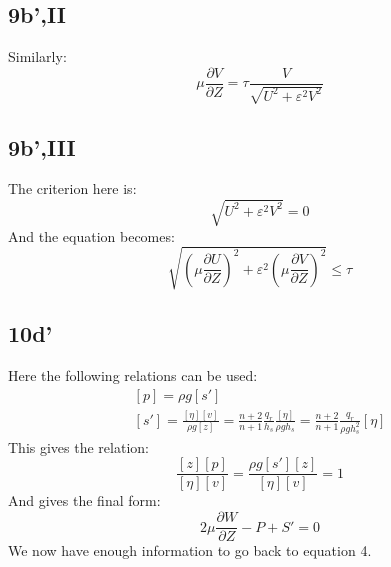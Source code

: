 \documentclass[10pt, letterpaper, twoside]{article}
\newcommand{\pd}[2]{\frac{\partial#1}{\partial#2}}
\begin{document}
	\subsection{9b',II}
	Similarly:
	\begin{equation*}
		\mu\pd{V}{Z} = \tau\frac{V}{\sqrt{U^2+\varepsilon^2V^2}} \tag{30b,II}
	\end{equation*}
	\subsection{9b',III}
	The criterion here is:
	\begin{equation*}
		\sqrt{U^2+\varepsilon^2V^2}=0
	\end{equation*}
	And the equation becomes:
	\begin{equation*}
		\sqrt{\left(\mu\pd{U}{Z}\right)^2+\varepsilon^2\left(\mu\pd{V}{Z}\right)^2}\leq\tau \tag{30b,III}
	\end{equation*}
	\subsection{10d'}
	Here the following relations can be used:
	\begin{gather*}
		\left[p\right] = \rho g \left[s'\right] \tag{S4} \\
		\left[s'\right] = \frac{\left[\eta\right]\left[v\right]}{\rho g \left[z\right]} = \frac{n+2}{n+1}\frac{q_r}{h_s}\frac{\left[\eta\right]}{\rho g h_s} = \frac{n+2}{n+1}\frac{q_r}{\rho gh_s^2}\left[\eta\right] \tag{S5}
	\end{gather*}
	This gives the relation:
	\begin{equation*}
		\frac{\left[z\right]\left[p\right]}{\left[\eta\right]\left[v\right]} = \frac{\rho g \left[s'\right]\left[z\right]}{\left[\eta\right]\left[v\right]} = 1
	\end{equation*}
	And gives the final form:
	\begin{equation*}
		2\mu\pd{W}{Z} - P + S' = 0 \tag{27d}
	\end{equation*}
	We now have enough information to go back to equation 4.
\end{document}
